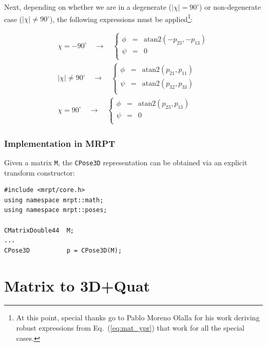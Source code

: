 \documentclass[a4paper,10pt]{report}
\begin{document}
Next, depending on whether we are in a degenerate ($|\chi|=90^\circ$) or 
non-degenerate case ($|\chi| \neq 90^\circ$), the following expressions must
be applied\footnote{At this point, special thanks go to 
Pablo Moreno Olalla for his work deriving robust expressions from Eq.~(\ref{eq:mat_ypr}) 
that work for all the special cases.}:

\begin{eqnarray}
  \chi = -90^\circ \quad \longrightarrow \quad
   \left\{
  \begin{array}{rcl}
    \phi  &=& \mathrm{atan2}( -p_{23}, -p_{13} ) \\
    \psi  &=& 0 \\
  \end{array}
   \right. 
\\
  |\chi| \neq 90^\circ \quad \longrightarrow \quad
   \left\{
  \begin{array}{rcl}
    \phi   &=& \mathrm{atan2}(p_{21},p_{11}) \\
    \psi  &=&  \mathrm{atan2}(p_{32},p_{33}) \\
  \end{array}
   \right. 
\\
  \chi = 90^\circ \quad \longrightarrow \quad
   \left\{
  \begin{array}{rcl}
    \phi  &=& \mathrm{atan2}( p_{23}, p_{13} ) \\
    \psi  &=& 0 \\
  \end{array}
   \right. 
\end{eqnarray}



\subsubsection{Implementation in MRPT}

Given a matrix \texttt{M}, the \texttt{CPose3D} representation can be obtained via
an explicit transform constructor:

\begin{lstlisting}
#include <mrpt/core.h> 
using namespace mrpt::math; 
using namespace mrpt::poses; 

CMatrixDouble44  M;
...
CPose3D          p = CPose3D(M);
\end{lstlisting}


\section{Matrix to 3D+Quat }
\end{document}
